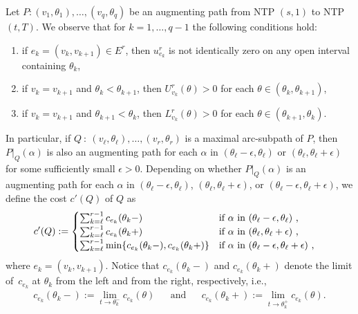 \documentclass{svjour3}                     \smartqed
\begin{document}
Let $P:(v_1,\theta_{1}),\ldots,(v_q,\theta_{q})$ be an augmenting path from NTP $(s,1)$ to NTP $(t,T)$. We observe that for $k=1,\ldots,q-1$ the following conditions hold:
\begin{enumerate}[label = (\roman*)]
\item\label{it:AugPath1} if $e_k=(v_{k},v_{k+1})\in E^r$, then $u^r_{e_k}$ is not identically zero on any open interval containing $\theta_k$,
\item\label{it:AugPath3} if $v_{k}=v_{k+1}$ and $\theta_{k}<\theta_{k+1}$, then $U^r_{v_{k}}(\theta)>0$ for each $\theta\in (\theta_{k},\theta_{k+1})$,
\item\label{it:AugPath4} if $v_{k}=v_{k+1}$ and $\theta_{k+1}<\theta_{k}$, then $L^r_{v_{k}}(\theta)>0$ for each $\theta\in (\theta_{k+1},\theta_{k})$.
\end{enumerate}
In particular, if $Q~:~(v_\ell,\theta_\ell),\ldots,(v_r,\theta_r)$ is a maximal arc-subpath of $P$, then $P|_Q(\alpha)$ is also an augmenting path for each $\alpha$ in $(\theta_\ell-\epsilon,\theta_\ell)$ or $(\theta_\ell,\theta_\ell+\epsilon)$ for some sufficiently small $\epsilon>0$. Depending on whether  $P|_Q(\alpha)$ is an augmenting path for each $\alpha$ in $(\theta_\ell-\epsilon,\theta_\ell)$, $(\theta_\ell,\theta_\ell+\epsilon)$, or $(\theta_\ell-\epsilon,\theta_\ell+\epsilon)$, we define the cost $c'(Q)$ of $Q$ as
\begin{align}
\label{eq:aug-cost'}
c'(Q)&:=\begin{cases}	
                 \sum_{k=\ell}^{r-1}{c_{e_k}(\theta_{k}-)}& \hbox{if $\alpha$ in $(\theta_\ell-\epsilon,\theta_\ell)$~,}\\
                 \sum_{k=\ell}^{r-1}{c_{e_k}(\theta_{k}+)}& \hbox{if $\alpha$ in $(\theta_\ell,\theta_\ell+\epsilon)$~,}\\
                 \sum_{k=\ell}^{r-1}{\min\{c_{e_k}(\theta_{k}-),c_{e_k}(\theta_{k}+)\}} & \hbox{if $\alpha$ in $(\theta_\ell-\epsilon,\theta_\ell+\epsilon)$~,}
                \end{cases}
\end{align}
where $e_k=(v_k,v_{k+1})$. Notice that $c_{e_k}(\theta_{k}-)$ and $c_{e_k}(\theta_{k}+)$ denote the limit of~$c_{e_k}$ at $\theta_k$ from the left and from the right, respectively, i.e.,
\begin{align*}
c_{e_k}(\theta_{k}-):=\lim_{t\rightarrow \theta_k^-} c_{e_k}(\theta)&& \text{and} && c_{e_k}(\theta_{k}+):=\lim_{t\rightarrow \theta_k^+}c_{e_k}(\theta).
\end{align*}
\end{document}
